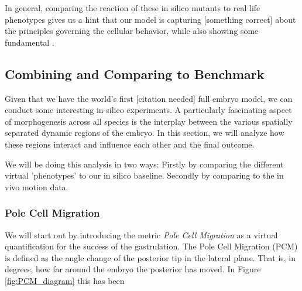 In general, comparing the reaction of these in silico mutants to real life phenotypes gives us a hint that our model is capturing [something correct] about the principles governing the cellular behavior, while also showing some fundamental . 






\subsection{Combining and Comparing to Benchmark}


Given that we have the world’s first [citation needed] full embryo model, we can conduct some interesting in-silico experiments. A particularly fascinating aspect of morphogenesis across all species is the interplay between the various spatially separated dynamic regions of the embryo. In this section, we will analyze how these regions interact and influence each other and the final outcome.

We will be doing this analysis in two ways: Firstly by comparing the different virtual 'phenotypes' to our in silico baseline. Secondly by comparing to the in vivo motion data.  

\subsubsection{Pole Cell Migration}
We will start out by introducing the metric \textit{Pole Cell Migration} as a virtual quantification for the success of the gastrulation. The Pole Cell Migration (PCM) is defined as the angle change of the posterior tip in the lateral plane. That is, in degrees, how far around the embryo the posterior has moved. In Figure \ref{fig:PCM_diagram} this has been \\


